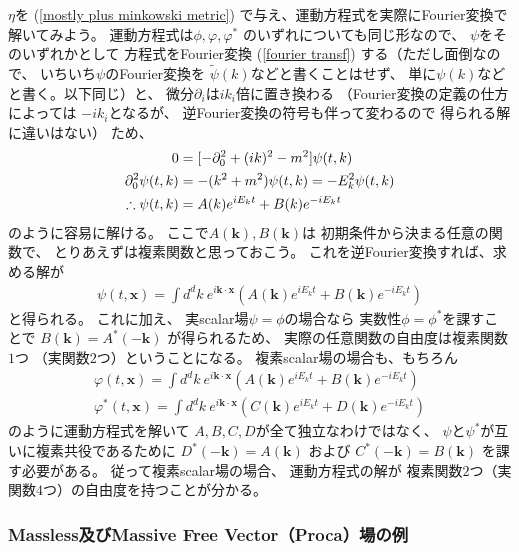 $\eta$を
(\ref{mostly plus minkowski metric})
で与え、運動方程式を実際にFourier変換で解いてみよう。
運動方程式は$\phi, \varphi, \varphi^*$
のいずれについても同じ形なので、
$\psi$をそのいずれかとして
方程式をFourier変換
(\ref{fourier transf})
する（ただし面倒なので、
いちいち$\psi$のFourier変換を
$\tilde{\psi} (k)$などと書くことはせず、
単に$\psi(k)$などと書く。以下同じ）と、
微分$\partial_i$は$i k_i$倍に置き換わる
（Fourier変換の定義の仕方によっては
$- i k_i$となるが、
逆Fourier変換の符号も伴って変わるので
得られる解に違いはない）
ため、
\begin{align}
    0
&=
    [- \partial_0^2 + (i k)^2 - m^2]
    \psi (t, k)
\notag\\
    \partial_0^2 \psi (t, k)
&=
    - (k^2 + m^2)
    \psi (t, k)
=
    - E_k^2
    \psi (t, k)
\notag\\
    \therefore
    \psi (t, k)
&=
    A (k) e^{i E_k t}
    +
    B (k) e^{- i E_k t}
\end{align}
のように容易に解ける。
ここで$A(\bm{k}), B(\bm{k})$は
初期条件から決まる任意の関数で、
とりあえずは複素関数と思っておこう。
これを逆Fourier変換すれば、求める解が
\begin{align}
    \psi (t, \bm{x})
=
    \int d^d k\ 
    e^{i \bm{k} \cdot \bm{x}}
    \left(
        A (\bm{k}) e^{i E_k t}
        +
        B (\bm{k}) e^{- i E_k t}
    \right)
\end{align}
と得られる。
これに加え、
実scalar場$\psi = \phi$の場合なら
実数性$\phi = \phi^*$を課すことで
$B (\bm{k}) = A^* (- \bm{k})$
が得られるため、
実際の任意関数の自由度は複素関数$1$つ
（実関数$2$つ）ということになる。
複素scalar場の場合も、もちろん
\begin{align*}
    \varphi (t, \bm{x})
=
    \int d^d k\ 
    e^{i \bm{k} \cdot \bm{x}}
    \left(
        A (\bm{k}) e^{i E_k t}
        +
        B (\bm{k}) e^{- i E_k t}
    \right)
\\
    \varphi^* (t, \bm{x})
=
    \int d^d k\ 
    e^{i \bm{k} \cdot \bm{x}}
    \left(
        C (\bm{k}) e^{i E_k t}
        +
        D (\bm{k}) e^{- i E_k t}
    \right)
\end{align*}
のように運動方程式を解いて
$A, B, C, D$が全て独立なわけではなく、
$\psi$と$\psi^*$が互いに複素共役であるために
$D^*(- \bm{k}) = A (\bm{k})$
および
$C^*(- \bm{k}) = B (\bm{k})$
を課す必要がある。
従って複素scalar場の場合、
運動方程式の解が
複素関数$2$つ（実関数$4$つ）の自由度を持つことが分かる。

\subsubsection{Massless及びMassive Free Vector（Proca）場の例}

